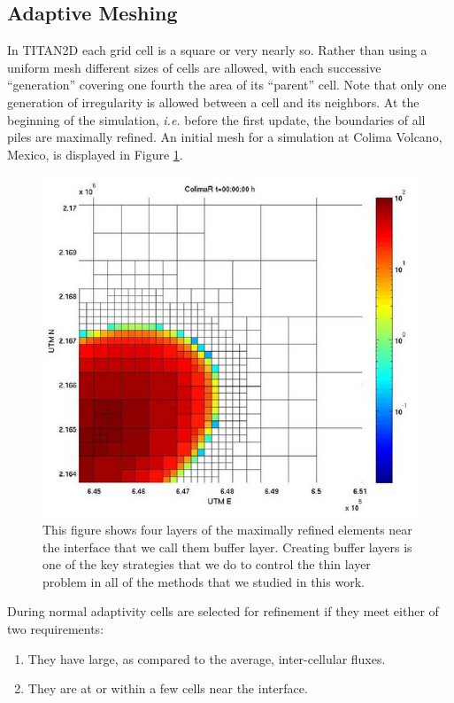 \documentclass[letterpaper,10pt]{article}
\begin{document}
\subsection{Adaptive Meshing} \label{adaptivemeshing}
In TITAN2D each grid cell is a square or very nearly so. Rather than 
using a uniform mesh different sizes of cells are allowed, with each 
successive ``generation'' covering one fourth the area of its ``parent'' 
cell.  Note that only one generation of irregularity is allowed between 
a cell and its neighbors.
At the beginning of the simulation, \textit{i.e.} before the first update, the 
boundaries of all piles are maximally refined. An initial mesh for a 
simulation at Colima Volcano, Mexico, is displayed in Figure \ref{bufcell}. 
\begin{figure}[!h]
        \begin{center}
                \includegraphics[scale=.3]{IMAGES/buffercells.png}
                \caption{This figure shows four layers of the maximally refined elements near the interface that we call them buffer layer. Creating buffer layers is one of the key strategies that we do to control the thin layer problem in all of the methods that we studied in this work.}
                \label{bufcell}
        \end{center}
\end{figure} 
During normal adaptivity cells are selected for refinement if they meet 
either of two requirements:
\begin{enumerate} 
        \item They have large, as compared to the average, inter-cellular fluxes.
        \item They are at or within a few cells near the interface.
\end{enumerate}
\end{document}
